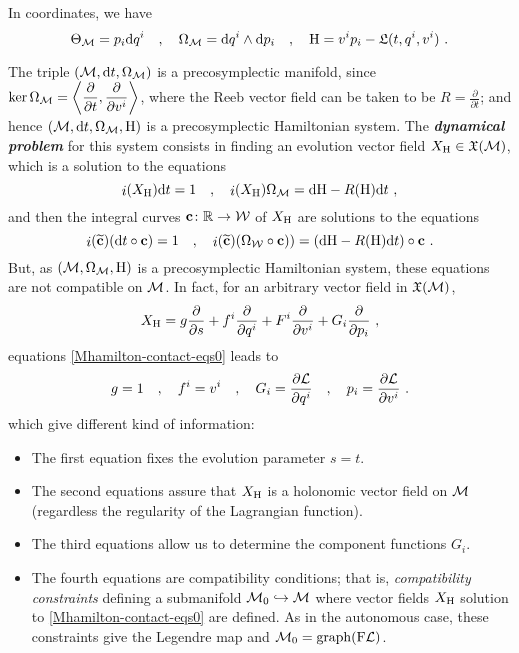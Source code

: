 \documentclass[12pt]{report}
\def\beq{\begin{equation}}
\def\eeq{\end{equation}}
\def\dst{\displaystyle}
\def\derpar#1#2{\frac{\partial{#1}}{\partial{#2}}}
\def\vf{\mathfrak X}
\def\Lag{{\cal L}}
\def\d{{\rm d}}
\def\Real{\mathbb{R}}
\def\inn{\mathop{i}\nolimits}
\begin{document}
In coordinates, we have
$$
\Theta_{\cal M}=p_i\d q^i \quad , \quad
\Omega_{\cal M}=\d q^i\wedge\d p_i\quad , \quad
{\rm H}=v^ip_i-{\mathfrak L}(t,q^i,v^i) \ .
$$

The triple $({\cal M},\d t,\Omega_{\cal M})$ is a precosymplectic manifold, since
$\dst\ker\Omega_{\cal M}=\left\langle\derpar{}{t},\derpar{}{v^i}\right\rangle$,
where the Reeb vector field can be taken to be
$\dst R=\derpar{}{t}$;
and hence
$({\cal M},\d t,\Omega_{\cal M},{\rm H})$ is a precosymplectic Hamiltonian system.
The {\sl\textbf{dynamical problem}} for this system consists in finding
an evolution vector field $X_{\rm H}\in\vf({\cal M})$,
which is a solution to the equations
\begin{equation}
\label{Mhamilton-contact-eqs0}
\inn(X_{\rm H})\d t=1 \quad , \quad
\inn(X_{\rm H})\Omega_{\cal M}=\d{\rm H}-R({\rm H})\d t \ ,
\end{equation}
and then the integral curves ${\bf c}\colon\Real\to{\cal W}$
 of $X_{\rm H}$ are solutions to the equations
\begin{equation}
\label{Mhamilton-contact-eqs0b}
\inn(\widetilde{\bf c})(\d t\circ{\bf c})=1 \quad , \quad
\inn(\widetilde{\bf c})(\Omega_{\cal W}\circ{\bf c}))=\left(\d{\rm H}-R({\rm H})\d t\right)\circ{\bf c} \ .
\end{equation}
But,  as $({\cal M},\Omega_{\cal M},{\rm H})$ is a precosymplectic Hamiltonian system,
these equations are not compatible on ${\cal M}$.
In fact, for an arbitrary vector field in $\vf({\cal M})$,
$$
X_{\rm H} =g\derpar{}{s}+ f^i\derpar{}{q^i}+F^i\derpar{}{v^i}+G_i\derpar{}{p_i} \ ,
$$ 
equations \eqref{Mhamilton-contact-eqs0} leads to
\beq
g= 1 \quad , \quad
f^i= v^i \quad , \quad
G_i= \displaystyle \derpar{\Lag}{q^i} \quad ,  \quad
p_i= \derpar{\Lag}{v^i}  \ . 
\label{Mfirstuni}
\eeq
which give different kind of information:
\begin{itemize}
\item
The first equation fixes the evolution parameter $s=t$.
\item
The second equations assure that $X_{\rm H}$ is a holonomic vector field on ${\cal M}$
(regardless the regularity of the Lagrangian function).
\item
The third equations allow us to determine the component functions $G_i$.
\item
The fourth equations are compatibility conditions;
that is, {\sl compatibility constraints} defining a submanifold 
${\cal M}_0\hookrightarrow{\cal M}$
where vector fields $X_{\rm H}$ solution to \eqref{Mhamilton-contact-eqs0} are defined.
As in the autonomous case, these constraints give the Legendre map and ${\cal M}_0={\rm graph}({{\rm F}\Lag})$.
\end{itemize}
\end{document}
